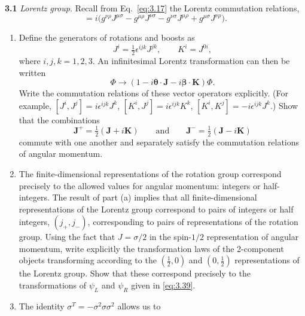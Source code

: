 \textbf{3.1} \emph{Lorentz group.}  Recall from Eq.~\eqref{eq:3.17} the
Lorentz commutation relations,
\begin{equation}
  [J^{\mu\nu}, J^{\rho\sigma}] = i\bigl( g^{\nu\rho}J^{\mu\sigma}
    - g^{\mu\rho}J^{\nu\sigma} - g^{\nu\sigma}J^{\mu\rho}
    + g^{\mu\sigma}J^{\nu\rho} \bigr).
\end{equation}
\begin{enumerate}[label=(\alph*)]
  \item Define the generators of rotations and boosts as
    \begin{equation}
      J^i = \tfrac{1}{2}\epsilon^{ijk}J^{jk},\qquad
      K^i = J^{0i},
    \end{equation}
    where $i, j, k = 1, 2, 3$.  An infinitesimal Lorentz transformation can
    then be written
    \begin{equation}
      \Phi \to (1 - i\bm{\theta}\cdot\mathbf{J} - i\bm{\beta}\cdot\mathbf{K})\Phi .
    \end{equation}
    Write the commutation relations of these vector operators explicitly.
    (For example, $[J^i, J^j] = i\epsilon^{ijk}J^k$, $[K^i, J^j] =
    i\epsilon^{ijk}K^k$, $[K^i, K^j] = -i\epsilon^{ijk}J^k$.)  Show that the
    combinations
    \begin{equation}
      \mathbf{J}^{+} = \tfrac{1}{2}(\mathbf{J} + i\mathbf{K})
      \qquad\text{and}\qquad
      \mathbf{J}^{-} = \tfrac{1}{2}(\mathbf{J} - i\mathbf{K})
    \end{equation}
    commute with one another and separately satisfy the commutation relations
    of angular momentum.
  \item The finite-dimensional representations of the rotation group
    correspond precisely to the allowed values for angular momentum: integers
    or half-integers.  The result of part (a) implies that all
    finite-dimensional representations of the Lorentz group correspond to
    pairs of integers or half integers, $(j_+, j_-)$, corresponding to pairs
    of representations of the rotation group.  Using the fact that
    $J = \sigma/2$ in the spin-$1/2$ representation of angular momentum,
    write explicitly the transformation laws of the 2-component objects
    transforming according to the $(\tfrac{1}{2}, 0)$ and
    $(0, \tfrac{1}{2})$ representations of the Lorentz group.  Show that
    these correspond precisely to the transformations of $\psi_L$ and
    $\psi_R$ given in \eqref{eq:3.39}.
  \item The identity $\sigma^T = -\sigma^2\sigma\sigma^2$ allows us to

\end{enumerate}
